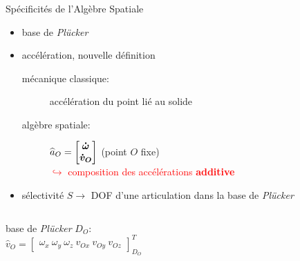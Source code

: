 \documentclass[10pt]{beamer}
\begin{document}
\begin{frame}
  \frametitle{}
  

  \begin{block}{Spécificités de l'Algèbre Spatiale}
  \begin{spacing}{1.2}
  \begin{itemize}
	  \item base de \emph{Plücker}
	  \item accélération, nouvelle définition
	  \begin{description}
	    \item[mécanique classique:] accélération du point lié au solide
	    \item[algèbre spatiale:] $\widehat{a}_O = \boldsymbol{\begin{bmatrix} \dot{\omega} \\ \dot{v}_O \end{bmatrix}}$ (point $O$ fixe) \\
	                             \textcolor{red}{$\hookrightarrow$ composition des accélérations \textbf{additive}}
	  \end{description}
	  \item sélectivité $S \rightarrow $ DOF d'une articulation dans la base de \emph{Plücker}
	\end{itemize}
	\end{spacing}
  \end{block}
  
  \begin{columns}[onlytextwidth]
    \begin{column}{.6\textwidth}
      base de \emph{Plücker} $D_O$: \\
      $\widehat{v}_O = \begin{bmatrix} \omega_x \: \omega_y \: \omega_z \: v_{Ox} \: v_{Oy} \: v_{Oz} \end{bmatrix}_{D_O}^T$
    \end{column}
    \begin{column}{.4\textwidth}
    \end{column}
  \end{columns}
  
\end{frame}
\end{document}
